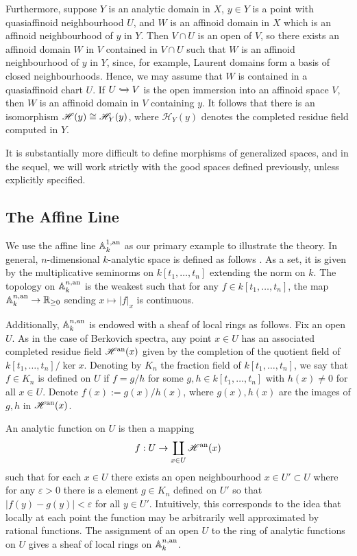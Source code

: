 Furthermore, suppose $Y$ is an analytic domain in $X$, $y \in Y$ is a point with quasiaffinoid neighbourhood $U$, and $W$ is an affinoid domain in $X$ which is an affinoid neighbourhood of $y$ in $Y$.
Then $V \cap U$ is an open of $V$, so there exists an affinoid domain $W$ in $V$ contained in $V \cap U$ such that $W$ is an affinoid neighbourhood of $y$ in $Y$, since, for example, Laurent domains form a basis of closed neighbourhoods.
Hence, we may assume that $W$ is contained in a quasiaffinoid chart $U$.
If $U \xhookrightarrow{} V$ is the open immersion into an affinoid space $V$, then $W$ is an affinoid domain in $V$ containing $y$.
It follows that there is an isomorphism $\mathscr{H}(y) \cong \mathscr{H}_{Y}(y)$, where $\mathscr{H}_{Y}(y)$ denotes the completed residue field computed in $Y$.

It is substantially more difficult to define morphisms of generalized spaces, and in the sequel, we will work strictly with the good spaces defined previously, unless explicitly specified.

\subsection{The Affine Line}

We use the affine line $\mathbb{A}^{1, \text{an}}_{k}$ as our primary example to illustrate the theory. In general, $n$-dimensional $k$-analytic space is defined as follows \parencite[\S 1.5]{berk1}. 
As a set, it is given by the multiplicative seminorms on $k[t_1, \dots, t_n]$ extending the norm on $k$. The topology on $\mathbb{A}^{n, \text{an}}_{k}$ is the weakest such that for any $f \in k[t_1, \dots, t_n]$, the map $\mathbb{A}^{n, \text{an}}_{k} \to \mathbb{R}_{\geq 0}$ sending $x \mapsto |f|_x$ is continuous. 

Additionally, $\mathbb{A}^{n, \text{an}}_{k}$ is endowed with a sheaf of local rings as follows. Fix an open $U$. As in the case of Berkovich spectra, any point $x \in U$ has an associated completed residue field $\mathscr{H}^{\text{an}}(x)$ given by the completion of the quotient field of $k[t_1, \dots, t_n]/\ker x$. 
Denoting by $K_n$ the fraction field of $k[t_1, \dots, t_n]$, we say that $f \in K_n$ is defined on $U$ if $f = g/h$ for some $g, h \in k[t_1, \dots, t_n]$ with $h(x) \neq 0$ for all $x \in U$. Denote $f(x) := g(x)/h(x)$, where $g(x), h(x)$ are the images of $g, h$ in $\mathscr{H}^{\text{an}}(x)$.

An analytic function on $U$ is then a mapping 
\begin{align*}
    f: U \to \coprod_{x \in U} \mathscr{H}^{\text{an}}(x)
\end{align*}
such that for each $x \in U$ there exists an open neighbourhood $x \in U' \subset U$ where for any $\varepsilon > 0$ there is a element $g \in K_n$ defined on $U'$ so that $|f(y) - g(y)| < \varepsilon$ for all $y \in U'$. Intuitively, this corresponds to the idea that locally at each point the function may be arbitrarily well approximated by rational functions. 
The assignment of an open $U$ to the ring of analytic functions on $U$ gives a sheaf of local rings on $\mathbb{A}^{n, \text{an}}_{k}$.

